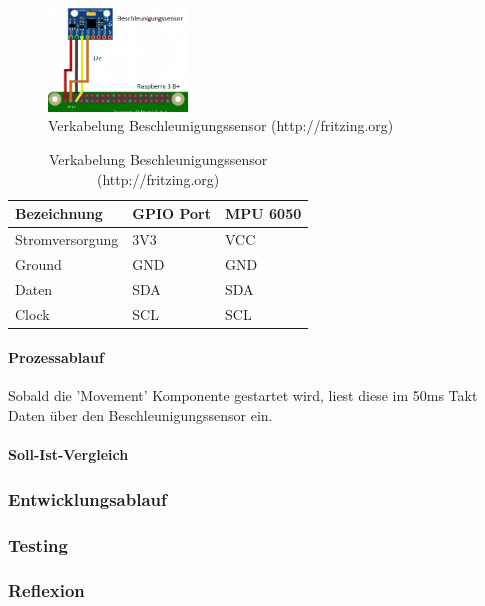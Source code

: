 \documentclass[../../main.tex]{subfiles}
\begin{document}
\begin{table}[H]
  \begin{figure}[H] \centering
    \includegraphics[width=0.33\textwidth]{Verkabelung_BeschlSensor}
    \caption{Verkabelung Beschleunigungssensor (http://fritzing.org)}
    \label{fig:Beschleunigungssensor}
  \end{figure}
  \begin{center}
  \begin{tabular}{lll}
  Bezeichnung     & GPIO Port & MPU 6050 \\ \hline
  Stromversorgung & 3V3      & VCC      \\ \hline
  Ground          & GND      & GND      \\ \hline
  Daten          & SDA      & SDA       \\ \hline
  Clock          & SCL      & SCL       \\ \hline
  \end{tabular}
  \end{center}
\end{table}

\paragraph{Prozessablauf}
Sobald die 'Movement' Komponente gestartet wird, liest diese im 50ms Takt Daten über den Beschleunigungssensor ein.

\paragraph{Soll-Ist-Vergleich}


\subsubsection{Entwicklungsablauf}


\subsubsection{Testing}

\subsubsection{Reflexion}
\end{document}
